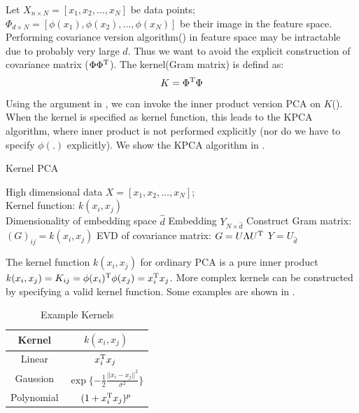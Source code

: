 Let $X_{n \times N} = [x_1, x_2, \ldots, x_N]$ be data points; 
$\Phi_{d \times N} = [\phi(x_1), \phi(x_2), \ldots, \phi(x_N)]$ be
their image in the feature space. Performing covariance 
version algorithm(\ralg{\ref{alg:pca_cov}}) in feature space 
may be intractable due to probably very large $ d $. Thus 
we want to avoid the explicit construction of covariance 
matrix ($ \Phi\Phi^\mathrm{T} $). 
The kernel(Gram matrix) is defind as:
\begin{equation}
	K = \Phi^\mathrm{T}\Phi 
\end{equation}
Using the argument in \rsec{\ref{sec:pca}}, we can 
invoke the inner product version PCA on $ K $(\ralg{\ref{alg:pca_in}}). 
When the kernel is specified as kernel function, 
this leads to the KPCA algorithm, where inner product
is not performed explicitly
(nor do we have to specify $ \phi(.) $ explicitly). 
We show the KPCA algorithm in 
\ralg{\ref{alg:kpac}}. 
 
\begin{algorithm}[htb]
	\caption{Kernel PCA}
	\label{alg:kpac}
	\begin{algorithmic}[1]
		\REQUIRE High dimensional data $X = [x_1, x_2, \ldots, x_N]$; \\
			Kernel function: $ k(x_i,x_j) $\\
			Dimensionality of embedding space $ \hat{d} $
		\ENSURE Embedding $ Y_{N \times \hat{d}} $
		\STATE Construct Gram matrix: $ (G)_{ij} = k(x_i,x_j)$
		\STATE EVD of covariance matrix: $ G = U \Lambda U^\mathrm{T} $
		\STATE $ Y = U_{\hat{d}} $
	\end{algorithmic}
\end{algorithm}

The kernel function $ k(x_i,x_j) $ for ordinary PCA is a pure 
inner product 
$ k(x_i,x_j) = K_{ij} = \phi(x_i)^\mathrm{T} \phi(x_j) = x_i^\mathrm{T}x_j $. 
More complex kernels can be constructed by specifying a valid 
kernel function. Some examples are shown in \rtbl{\ref{tbl:kernel_ex}}.

\begin{table}[htb]
	\centering
	\caption{Example Kernels}
	\label{tbl:kernel_ex}
	\begin{tabular}{c|c}
		\hline	
		Kernel & $ k(x_i,x_j) $ \\
		\hline	
		Linear & $ x_i^\mathrm{T}x_j $\\
		Gaussion & $ \exp\{ -\frac{1}{2}\frac{||x_i-x_j||^2}{\sigma^2} \} $ \\
		Polynomial & $ (1 + x_i^\mathrm{T}x_j)^p $ \\
		\hline
	\end{tabular}
\end{table}

